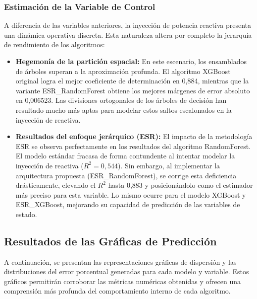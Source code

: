\subsubsection{Estimación de la Variable de Control}
A diferencia de las variables anteriores, la inyección de potencia reactiva presenta una dinámica operativa discreta. Esta naturaleza altera por completo la jerarquía de rendimiento de los algoritmos:
\begin{itemize}
	\item \textbf{Hegemonía de la partición espacial:} En este escenario, los ensamblados de árboles superan a la aproximación profunda. El algoritmo XGBoost original logra el mejor coeficiente de determinación en 0,884, mientras que la variante ESR\_RandomForest obtiene los mejores márgenes de error absoluto en 0,006523. Las divisiones ortogonales de los árboles de decisión han resultado mucho más aptas para modelar estos saltos escalonados en la inyección de reactiva.
	\item \textbf{Resultados del enfoque jerárquico (ESR):} El impacto de la metodología ESR se observa perfectamente en los resultados del algoritmo RandomForest. El modelo estándar fracasa de forma contundente al intentar modelar la inyección de reactiva ($R^2 = 0,544$). Sin embargo, al implementar la arquitectura propuesta (ESR\_RandomForest), se corrige esta deficiencia drásticamente, elevando el $R^2$ hasta 0,883 y posicionándolo como el estimador más preciso para esta variable. Lo mismo ocurre para el modelo XGBoost y ESR\_XGBoost, mejorando su capacidad de predicción de las variables de estado.
\end{itemize}

\subsection{Resultados de las Gráficas de Predicción}
A continuación, se presentan las representaciones gráficas de dispersión y las distribuciones del error porcentual generadas para cada modelo y variable. Estos gráficos permitirán corroborar las métricas numéricas obtenidas y ofrecen una comprensión más profunda del comportamiento interno de cada algoritmo.

